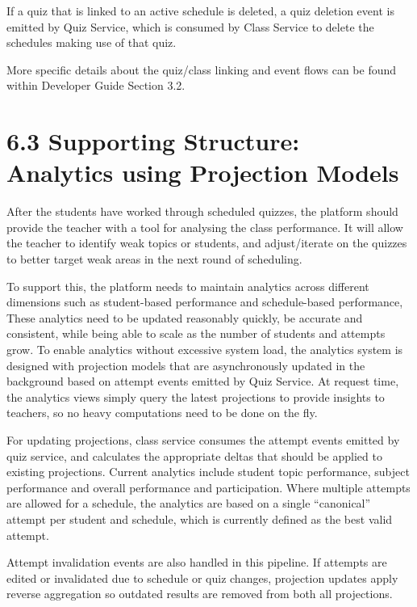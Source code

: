 \documentclass[
  12pt,
  a4paper,
]{report}
\begin{document}
If a quiz that is linked to an active schedule is deleted, a quiz deletion event is emitted by Quiz Service,
which is consumed by Class Service to delete the schedules making use of that quiz.

More specific details about the quiz/class linking and event flows can be found within Developer Guide Section 3.2.

\hypertarget{analytics-and-projection-models}{%
\section{6.3 Supporting Structure: Analytics using Projection
Models}\label{analytics-and-projection-models}}

After the students have worked through scheduled quizzes, the platform should
provide the teacher with a tool for analysing the class performance. It will allow the
teacher to identify weak topics or students, and adjust/iterate on the quizzes to better
target weak areas in the next round of scheduling.

To support this, the platform needs to maintain analytics across different dimensions such as
student-based performance and schedule-based performance, These analytics need to be updated reasonably
quickly, be accurate and consistent, while being able to scale as the number of students and attempts grow.
To enable analytics without excessive system load, the analytics system is designed with projection models that are
asynchronously updated in the background based on attempt events emitted by Quiz Service. At request time,
the analytics views simply query the latest projections to provide insights to teachers, so no
heavy computations need to be done on the fly.

For updating projections, class service consumes the attempt events emitted by quiz service, and calculates the
appropriate deltas that should be applied to existing projections. Current analytics include student topic performance,
subject performance and overall performance and participation. Where multiple attempts are allowed for a schedule,
the analytics are based on a single ``canonical'' attempt per student and schedule, which is currently defined as the
best valid attempt.

Attempt invalidation events are also handled in this pipeline. If
attempts are edited or invalidated due to schedule or quiz changes,
projection updates apply reverse aggregation so outdated results are
removed from both all projections.
\end{document}
